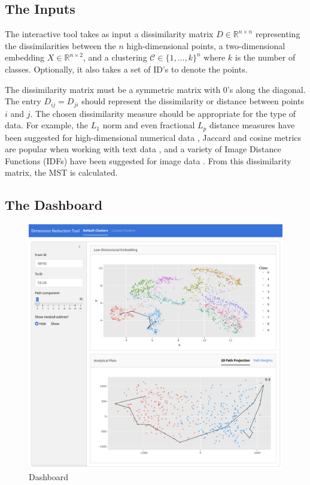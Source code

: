 \documentclass{article}
\begin{document}
\subsection{The Inputs}
The interactive tool takes as input a dissimilarity matrix $D \in \mathbb{R}^{n \times n}$ representing the dissimilarities between the $n$ high-dimensional points, a two-dimensional embedding $X \in \mathbb{R}^{n \times 2}$, and a clustering $\mathcal{C} \in \{1, \hdots, k\}^n$ where $k$ is the number of classes. Optionally, it also takes a set of ID's to denote the points.

The dissimilarity matrix must be a symmetric matrix with 0's along the diagonal. The entry $D_{ij} = D_{ji}$ should represent the dissimilarity or distance between points $i$ and $j$. The chosen dissimilarity measure should be appropriate for the type of data. For example, the $L_1$ norm and even fractional $L_p$ distance measures have been suggested for high-dimensional numerical data \cite{fractional Lp norms}, Jaccard and cosine metrics are popular when working with text data \cite{text data}, and a variety of Image Distance Functions (IDFs) have been suggested for image data \cite{image metrics}. From this dissimilarity matrix, the MST is calculated.

\subsection{The Dashboard}

\begin{figure}[t]
\centering
\includegraphics[scale=0.2]{dashboard}
\caption{Dashboard}
\end{figure}
\end{document}
